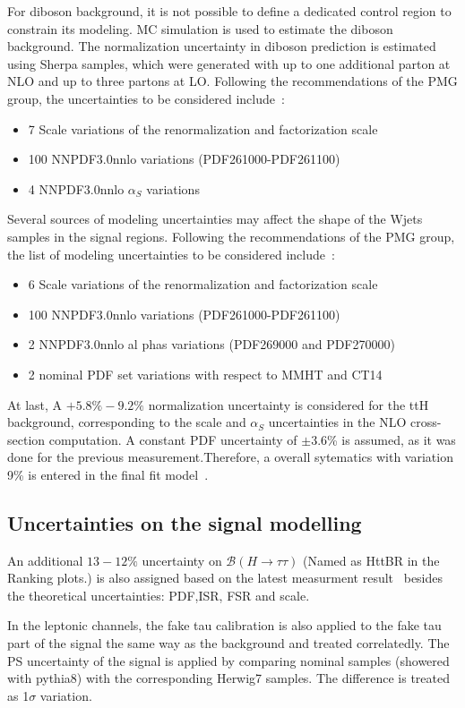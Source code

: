 For diboson background, it is not possible to define a dedicated control region to constrain its modeling. MC simulation is used to estimate the diboson background. The normalization uncertainty in diboson prediction is estimated using Sherpa samples, which were generated with up to one additional parton at NLO and up to three partons at LO. Following the recommendations of the PMG group, the uncertainties to be considered include~\cite{dibosonRes}: 
\begin{itemize}
	\item   7 Scale variations of the renormalization and factorization scale
	\item   100 NNPDF3.0nnlo variations (PDF261000-PDF261100)
	\item   4 NNPDF3.0nnlo $\alpha_{S}$ variations
\end{itemize}

Several sources of modeling uncertainties may affect the shape of the Wjets samples in the signal regions. Following the recommendations of the PMG group, the list of modeling uncertainties to be considered include~\cite{dibosonRes}:
\begin{itemize}
\item 6 Scale variations of the renormalization and factorization scale
\item 100 NNPDF3.0nnlo variations (PDF261000-PDF261100)
\item 2 NNPDF3.0nnlo al phas variations (PDF269000 and PDF270000)
\item 2 nominal PDF set variations with respect to MMHT and CT14
\end{itemize}

At last, A $+5.8\%-9.2\%$ normalization uncertainty is considered for the ttH background, corresponding to the scale and $\alpha_{S}$ uncertainties in the NLO cross-section computation. A constant PDF uncertainty of
$\pm3.6$\% is assumed, as it was done for the previous measurement.Therefore, a overall sytematics with variation 9\% is entered in the final fit model~\cite{ttZRun2}.

\subsection{Uncertainties on the signal modelling}

An additional $13-12\%$ uncertainty on $\mathcal{B}(H\to\tau\tau)$ (Named as HttBR in the Ranking plots.) is also assigned based on the latest measurment result~\cite{HiggsBR}
besides the theoretical uncertainties: PDF,ISR, FSR and scale.

In the leptonic channels, the fake tau calibration is also applied to the fake tau part of the signal the same way as the background and treated correlatedly.
The PS uncertainty of the signal is applied by comparing nominal samples (showered with pythia8) with the corresponding Herwig7 samples. The difference is treated as 1$\sigma$ variation.

